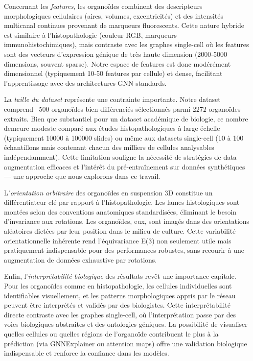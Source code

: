 Concernant les \textit{features}, les organoïdes combinent des descripteurs morphologiques cellulaires (aires, volumes, excentricités) et des intensités multicanal continues provenant de marqueurs fluorescents. Cette nature hybride est similaire à l'histopathologie (couleur RGB, marqueurs immunohistochimiques), mais contraste avec les graphes single-cell où les features sont des vecteurs d'expression génique de très haute dimension (2000-5000 dimensions, souvent sparse). Notre espace de features est donc modérément dimensionnel (typiquement 10-50 features par cellule) et dense, facilitant l'apprentissage avec des architectures GNN standards.

La \textit{taille du dataset} représente une contrainte importante. Notre dataset comprend ~500 organoïdes bien différenciés sélectionnés parmi 2272 organoïdes extraits. Bien que substantiel pour un dataset académique de biologie, ce nombre demeure modeste comparé aux études histopathologiques à large échelle (typiquement 10000 à 100000 slides) ou même aux datasets single-cell (10 à 100 échantillons mais contenant chacun des milliers de cellules analysables indépendamment). Cette limitation souligne la nécessité de stratégies de data augmentation efficaces et l'intérêt du pré-entraînement sur données synthétiques — une approche que nous explorons dans ce travail.

L'\textit{orientation arbitraire} des organoïdes en suspension 3D constitue un différentiateur clé par rapport à l'histopathologie. Les lames histologiques sont montées selon des conventions anatomiques standardisées, éliminant le besoin d'invariance aux rotations. Les organoïdes, eux, sont imagés dans des orientations aléatoires dictées par leur position dans le milieu de culture. Cette variabilité orientationnelle inhérente rend l'équivariance E(3) non seulement utile mais pratiquement indispensable pour des performances robustes, sans recourir à une augmentation de données exhaustive par rotations.

Enfin, l'\textit{interprétabilité biologique} des résultats revêt une importance capitale. Pour les organoïdes comme en histopathologie, les cellules individuelles sont identifiables visuellement, et les patterns morphologiques appris par le réseau peuvent être interprétés et validés par des biologistes. Cette interprétabilité directe contraste avec les graphes single-cell, où l'interprétation passe par des voies biologiques abstraites et des ontologies géniques. La possibilité de visualiser quelles cellules ou quelles régions de l'organoïde contribuent le plus à la prédiction (via GNNExplainer ou attention maps) offre une validation biologique indispensable et renforce la confiance dans les modèles.